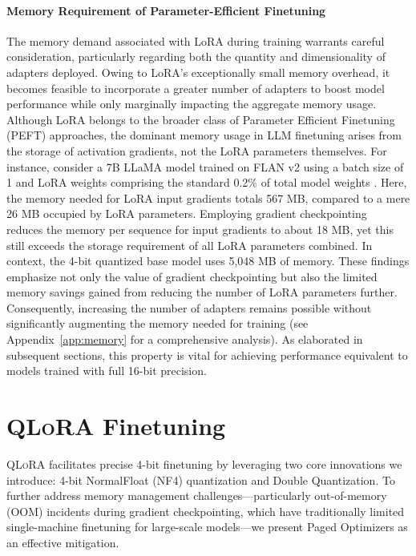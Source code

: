 \paragraph{Memory Requirement of Parameter-Efficient Finetuning} The memory demand associated with LoRA during training warrants careful consideration, particularly regarding both the quantity and dimensionality of adapters deployed. Owing to LoRA’s exceptionally small memory overhead, it becomes feasible to incorporate a greater number of adapters to boost model performance while only marginally impacting the aggregate memory usage. Although LoRA belongs to the broader class of Parameter Efficient Finetuning (PEFT) approaches, the dominant memory usage in LLM finetuning arises from the storage of activation gradients, not the LoRA parameters themselves. For instance, consider a 7B LLaMA model trained on FLAN v2 using a batch size of 1 and LoRA weights comprising the standard 0.2\% of total model weights \citep{hu2021lora,liu2022few}. Here, the memory needed for LoRA input gradients totals 567 MB, compared to a mere 26 MB occupied by LoRA parameters. Employing gradient checkpointing~\citep{chen2016training} reduces the memory per sequence for input gradients to about 18 MB, yet this still exceeds the storage requirement of all LoRA parameters combined. In context, the 4-bit quantized base model uses 5,048 MB of memory. These findings emphasize not only the value of gradient checkpointing but also the limited memory savings gained from reducing the number of LoRA parameters further. Consequently, increasing the number of adapters remains possible without significantly augmenting the memory needed for training (see Appendix~\ref{app:memory} for a comprehensive analysis). As elaborated in subsequent sections, this property is vital for achieving performance equivalent to models trained with full 16-bit precision.

\section{\textsc{QLoRA} Finetuning}

\textsc{QLoRA} facilitates precise 4-bit finetuning by leveraging two core innovations we introduce: 4-bit NormalFloat (NF4) quantization and Double Quantization. To further address memory management challenges—particularly out-of-memory (OOM) incidents during gradient checkpointing, which have traditionally limited single-machine finetuning for large-scale models—we present Paged Optimizers as an effective mitigation.

